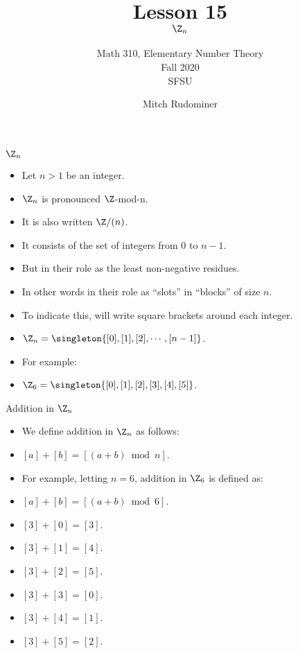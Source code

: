 \documentclass{beamer}
\title{Lesson 15 \\ $\Z_n$}
\subtitle{Math 310, Elementary Number Theory \\ Fall 2020 \\ SFSU}
\author{Mitch Rudominer}
\date{}
\begin{document}
\begin{frame}
  \titlepage
\end{frame}

\begin{frame}{$\Z_n$}

\begin{itemize}
  \item Let $n>1$ be an integer.
  \item $\Z_n$ is pronounced $\Z$-mod-n.
  \item It is also written $\Z/(n)$.
  \item It consists of the  set of integers from $0$ to $n-1$.
  \item But in their role as the least non-negative residues.
  \item In other words in their role as ``slots'' in ``blocks'' of size $n$.
  \item To indicate this, will write square brackets around each integer.
  \item  $\Z_n=\singleton{[0],[1],[2],\cdots,[n-1]}$.
  \item For example:
  \item  $\Z_6=\singleton{[0],[1],[2],[3],[4],[5]}$.
\end{itemize}

\end{frame}

\begin{frame}{Addition in $\Z_n$}

\begin{itemize}
  \item We define addition in $\Z_n$ as follows:
  \item $[a] + [b] = [(a+b) \bmod n]$.
  \item For example, letting $n=6$, addition in $\Z_6$ is defined as:
  \item $[a] + [b] = [(a+b) \bmod 6]$.
  \item $[3] + [0] = [3]$.
  \item $[3] + [1] = [4]$.
  \item $[3] + [2] = [5]$.
  \item $[3] + [3] = [0]$.
  \item $[3] + [4] = [1]$.
  \item $[3] + [5] = [2]$.
\end{itemize}

\end{frame}
\end{document}
